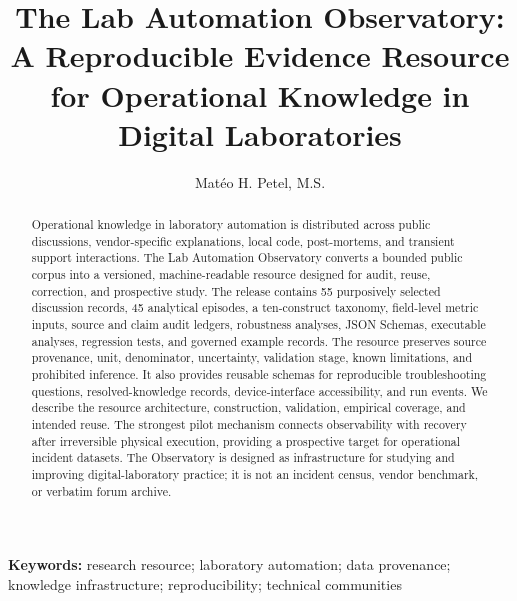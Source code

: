 \documentclass[11pt]{article}
\title{The Lab Automation Observatory: A Reproducible Evidence Resource for Operational Knowledge in Digital Laboratories}
\author[1,2]{Mat\'eo H. Petel, M.S.}
\affil[1]{Center for Strategic Research in Critical Technologies}
\affil[2]{SentinelOps}
\date{}
\begin{document}
\maketitle

\begin{abstract}
Operational knowledge in laboratory automation is distributed across public discussions, vendor-specific explanations, local code, post-mortems, and transient support interactions. The Lab Automation Observatory converts a bounded public corpus into a versioned, machine-readable resource designed for audit, reuse, correction, and prospective study. The release contains 55 purposively selected discussion records, 45 analytical episodes, a ten-construct taxonomy, field-level metric inputs, source and claim audit ledgers, robustness analyses, JSON Schemas, executable analyses, regression tests, and governed example records. The resource preserves source provenance, unit, denominator, uncertainty, validation stage, known limitations, and prohibited inference. It also provides reusable schemas for reproducible troubleshooting questions, resolved-knowledge records, device-interface accessibility, and run events. We describe the resource architecture, construction, validation, empirical coverage, and intended reuse. The strongest pilot mechanism connects observability with recovery after irreversible physical execution, providing a prospective target for operational incident datasets. The Observatory is designed as infrastructure for studying and improving digital-laboratory practice; it is not an incident census, vendor benchmark, or verbatim forum archive.
\end{abstract}

\noindent\textbf{Keywords:} research resource; laboratory automation; data provenance; knowledge infrastructure; reproducibility; technical communities













\end{document}
